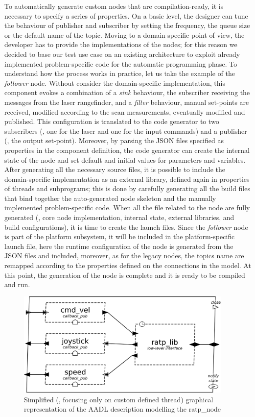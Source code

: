 To automatically generate custom nodes that are compilation-ready, it is necessary to specify a series of properties. On a basic level, the designer can tune the behaviour of publisher and subscriber by setting the frequency, the queue size or the default name of the topic. Moving to a domain-specific point of view, the developer has to provide the implementations of the nodes; for this reason we decided to base our test use case on an existing architecture to exploit already implemented problem-specific code for the automatic programming phase. To understand how the process works in practice, let us take the example of the \textit{follower} node. Without consider the domain-specific implementation, this component evokes a combination of a \textit{sink} behaviour, the subscriber receiving the messages from the laser rangefinder, and a \textit{filter} behaviour, manual set-points are received, modified according to the scan measurements, eventually modified and published. This configuration is translated to the code generator to two subscribers (\ie, one for the laser and one for the input commands) and a publisher (\ie, the output set-point). Moreover, by parsing the JSON files specified as properties in the component definition, the code generator can create the internal state of the node and set default and initial values for parameters and variables. After generating all the necessary source files, it is possible to include the domain-specific implementation as an external library, defined again in properties of threads and subprograms; this is done by carefully generating all the build files that bind together the auto-generated node skeleton and the manually implemented problem-specific code. When all the file related to the node are fully generated (\ie, core node implementation, internal state, external libraries, and build configurations), it is time to create the launch files. Since the \textit{follower} node is part of the platform subsystem, it will be included in the platform-specific launch file, here the runtime configuration of the node is generated from the JSON files and included, moreover, as for the legacy nodes, the topics name are remapped according to the properties defined on the connections in the model. At this point, the generation of the node is complete and it is ready to be compiled and run.

\begin{figure}[t]
\centering
\includegraphics[width=0.95\textwidth]{gfx/pmk/ratp}
\caption{Simplified (\ie, focusing only on custom defined thread) graphical representation of the AADL description modelling the ratp\_node}
\label{fig:pmk-ratp}
\end{figure}

